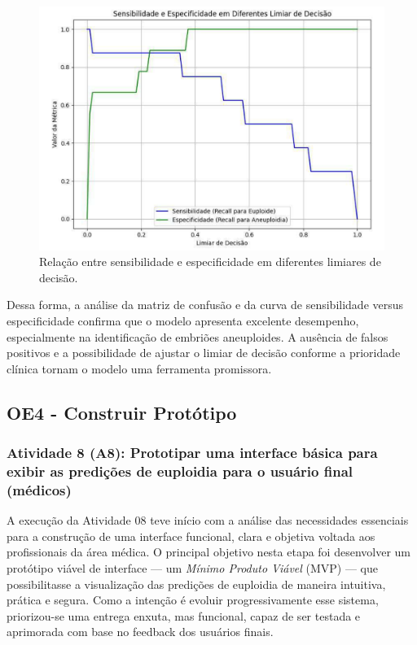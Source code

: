 \begin{figure}[h]
    \captionsetup{font=footnotesize, justification=centering, labelsep=period, position=above}
    \label{fig:sensibilidade}
    \centering
    \includegraphics[scale=0.45]{figuras/IA/sensibilidade.pdf}
    \caption{Relação entre sensibilidade e especificidade em diferentes limiares de decisão.}
\end{figure}
\FloatBarrier

Dessa forma, a análise da matriz de confusão e da curva de sensibilidade versus especificidade confirma que o modelo apresenta excelente desempenho, especialmente na identificação de embriões aneuploides. A ausência de falsos positivos e a possibilidade de ajustar o limiar de decisão conforme a prioridade clínica tornam o modelo uma ferramenta promissora.

\subsection{OE4 - Construir Protótipo}
\subsubsection{Atividade 8 (A8): Prototipar uma interface básica para exibir as predições de euploidia para o usuário final (médicos)}
A execução da Atividade 08 teve início com a análise das necessidades essenciais para a construção de uma interface funcional, clara e objetiva voltada aos profissionais da área médica. O principal objetivo nesta etapa foi desenvolver um protótipo viável de interface — um \textit{Mínimo Produto Viável} (MVP) — que possibilitasse a visualização das predições de euploidia de maneira intuitiva, prática e segura. Como a intenção é evoluir progressivamente esse sistema, priorizou-se uma entrega enxuta, mas funcional, capaz de ser testada e aprimorada com base no feedback dos usuários finais.

